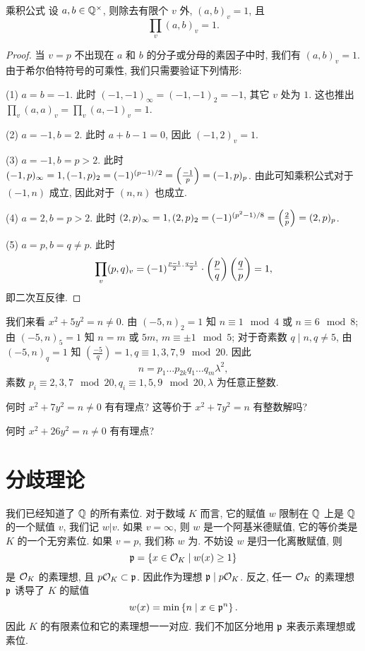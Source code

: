 \begin{theorem}{乘积公式}{}
设 $a,b\in{\mathbb{Q}}^\times$, 则除去有限个 $v$ 外, $(a,b)_v=1$, 且
  \[\prod_v (a,b)_v=1.\]
\end{theorem}
\begin{proof}
当 $v=p$ 不出现在 $a$ 和 $b$ 的分子或分母的素因子中时, 我们有 $(a,b)_v=1$. 由于希尔伯特符号的可乘性, 我们只需要验证下列情形:

(1) $a=b=-1$. 此时 $(-1,-1)_\infty=(-1,-1)_2=-1$, 其它 $v$ 处为 $1$. 这也推出 $\prod_v (a,a)_v=\prod_v (a,-1)_v=1$.

(2) $a=-1,b=2$. 此时 $a+b-1=0$, 因此 $(-1,2)_v=1$.

(3) $a=-1,b=p>2$. 此时 $(-1,p)_\infty=1,(-1,p)_2=(-1)^{(p-1)/2}=\left(\frac{{-1}}{p}\right)=(-1,p)_p$. 由此可知乘积公式对于 $(-1,n)$ 成立, 因此对于 $(n,n)$ 也成立.

(4) $a=2,b=p>2$. 此时 $(2,p)_\infty=1,(2,p)_2=(-1)^{(p^2-1)/8}=\left(\frac{{2}}{p}\right)=(2,p)_p$.

(5) $a=p,b=q\neq p$. 此时
  \[\prod_v(p,q)_v=(-1)^{\frac{p-1}{2}\cdot\frac{q-1}{2}}\cdot \left(\frac{{p}}{q}\right)\left(\frac{{q}}{p}\right)=1,\]
即二次互反律.
\end{proof}

\begin{example}
我们来看 $x^2+5y^2=n\neq 0$. 由 $(-5,n)_2=1$ 知 $n\equiv 1\mod 4$ 或 $n\equiv 6\mod 8$; 由 $(-5,n)_5=1$ 知 $n=m$ 或 $5m$, $m\equiv \pm 1\mod 5$; 对于奇素数 $q\mid n, q\neq 5$, 由 $(-5,n)_q=1$ 知 $(\frac{-5}{q})=1, q\equiv 1,3,7,9\mod{20}$.
因此 
  \[n=p_1\dots p_{2k} q_1\dots q_m \lambda^2,\]
素数 $p_i\equiv 2,3,7\mod {20},q_i\equiv 1,5,9\mod{20},\lambda$ 为任意正整数.
\end{example}

\begin{exercise}
何时 $x^2+7y^2=n\neq 0$ 有有理点? 这等价于 $x^2+7y^2=n$ 有整数解吗?
\end{exercise}

\begin{exercise}
何时 $x^2+26y^2=n\neq 0$ 有有理点?
\end{exercise}



\section{分歧理论}
\label{sec:ramification theory}
我们已经知道了 ${\mathbb{Q}}$ 的所有素位. 对于数域 $K$ 而言, 它的赋值 $w$ 限制在 ${\mathbb{Q}}$ 上是 ${\mathbb{Q}}$ 的一个赋值 $v$, 我们记 $w|v$. 如果 $v=\infty$, 则 $w$ 是一个阿基米德赋值, 它的等价类是 $K$ 的一个无穷素位. 如果 $v=p$, 我们称 $w$ 为. 不妨设 $w$ 是归一化离散赋值, 则
  \[{\mathfrak{p}}=\left\{x\in{\mathcal{O}}_K\mid w(x)\ge 1\right\}\]
是 ${\mathcal{O}}_K$ 的素理想, 且 $p{\mathcal{O}}_K\subset{\mathfrak{p}}$. 因此作为理想 ${\mathfrak{p}}\mid p{\mathcal{O}}_K$. 反之, 任一 ${\mathcal{O}}_K$ 的素理想 ${\mathfrak{p}}$ 诱导了 $K$ 的赋值
  \[w(x)=\min\left\{n\mid x\in{\mathfrak{p}}^n\right\}.\]
因此 $K$ 的有限素位和它的素理想一一对应. 我们不加区分地用 ${\mathfrak{p}}$ 来表示素理想或素位.

